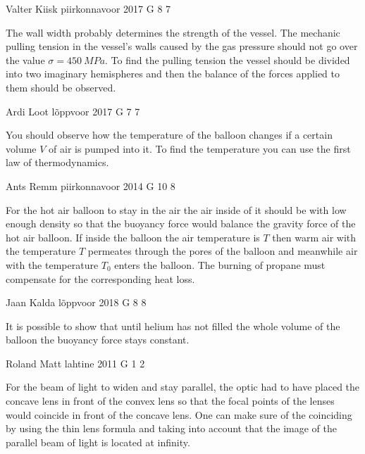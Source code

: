 \documentclass[11pt]{article}
\begin{document}
{Valter Kiisk} %
{piirkonnavoor} %
{2017} %
{G 8} %
{7} %
{

\ifEngHint
The wall width probably determines the strength of the vessel. The mechanic pulling tension in the vessel's walls caused by the gas pressure should not go over the value $\sigma=\SI{450}{MPa}$. To find the pulling tension the vessel should be divided into two imaginary hemispheres and then the balance of the forces applied to them should be observed.
\fi
}

{Ardi Loot} %
{lõppvoor} %
{2017} %
{G 7} %
{7} %
{

\ifEngHint
You should observe how the temperature of the balloon changes if a certain volume $V$ of air is pumped into it. To find the temperature you can use the first law of thermodynamics.
\fi
}

{Ants Remm} %
{piirkonnavoor} %
{2014} %
{G 10} %
{8} %
{

\ifEngHint
For the hot air balloon to stay in the air the air inside of it should be with low enough density so that the buoyancy force would balance the gravity force of the hot air balloon. If inside the balloon the air temperature is $T$ then warm air with the temperature $T$ permeates through the pores of the balloon and meanwhile air with the temperature $T_0$ enters the balloon. The burning of propane must compensate for the corresponding heat loss.
\fi
}

{Jaan Kalda} %
{lõppvoor} %
{2018} %
{G 8} %
{8} %
{

\ifEngHint
It is possible to show that until helium has not filled the whole volume of the balloon the buoyancy force stays constant.
\fi
}

{Roland Matt} %
{lahtine} %
{2011} %
{G 1} %
{2} %
{

\ifEngHint
For the beam of light to widen and stay parallel, the optic had to have placed the concave lens in front of the convex lens so that the focal points of the lenses would coincide in front of the concave lens. One can make sure of the coinciding by using the thin lens formula and taking into account that the image of the parallel beam of light is located at infinity.
\fi
}
\end{document}
